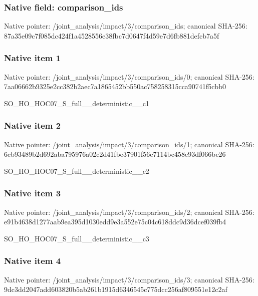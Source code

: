 \documentclass[10pt,a4paper]{article}
\begin{document}
\subsubsection{Native field: comparison\_\allowbreak{}ids}
Native pointer: /joint\_\allowbreak{}analysis/impact/3/comparison\_\allowbreak{}ids; canonical SHA-256: 87a35e09c7f085dc424f1a4528556e38fbc7d0647f4d59e7d6fb881defcb7a5f

\subsubsection{Native item 1}
Native pointer: /joint\_\allowbreak{}analysis/impact/3/comparison\_\allowbreak{}ids/0; canonical SHA-256: 7aa06662b9325e2cc382b2aec7a1865452bb550ac758258315cca90741f5cbb0

\begingroup\raggedright\sloppy SO\_\allowbreak{}HO\_\allowbreak{}HOC07\_\allowbreak{}S\_\allowbreak{}full\_\allowbreak{}\_\allowbreak{}deterministic\_\allowbreak{}\_\allowbreak{}c1\par\endgroup

\subsubsection{Native item 2}
Native pointer: /joint\_\allowbreak{}analysis/impact/3/comparison\_\allowbreak{}ids/1; canonical SHA-256: 6cb93489b2d692aba795976a02c2d41fbe37901f56c7114bc458e93df066bc26

\begingroup\raggedright\sloppy SO\_\allowbreak{}HO\_\allowbreak{}HOC07\_\allowbreak{}S\_\allowbreak{}full\_\allowbreak{}\_\allowbreak{}deterministic\_\allowbreak{}\_\allowbreak{}c2\par\endgroup

\subsubsection{Native item 3}
Native pointer: /joint\_\allowbreak{}analysis/impact/3/comparison\_\allowbreak{}ids/2; canonical SHA-256: e91b4638d1277aab9ea395d1030edd9e3a552e75c04c618ddc9d36dcef039fb4

\begingroup\raggedright\sloppy SO\_\allowbreak{}HO\_\allowbreak{}HOC07\_\allowbreak{}S\_\allowbreak{}full\_\allowbreak{}\_\allowbreak{}deterministic\_\allowbreak{}\_\allowbreak{}c3\par\endgroup

\subsubsection{Native item 4}
Native pointer: /joint\_\allowbreak{}analysis/impact/3/comparison\_\allowbreak{}ids/3; canonical SHA-256: 9dc3dd2047add603820b5ab261b1915d6346545c775dcc256af809551e12c2af
\end{document}
